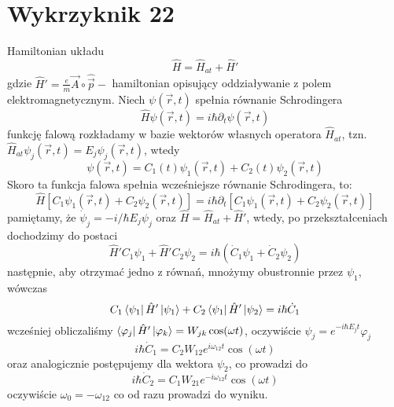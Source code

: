 \documentclass[a4paper,12pt]{article}
\begin{document}
\section{Wykrzyknik 22}
	Hamiltonian układu
		$$
		\hat{H} = \hat{H}_{at} + \hat{H}'
		$$
	gdzie $\hat{H}'=\frac{e}{m}\vec{A}\circ\hat{\vec{p}}-$ hamiltonian opisujący oddziaływanie z polem elektromagnetycznym. Niech $\psi(\vec{r},t)$ spełnia równanie Schrodingera
		$$
		\hat{H}\psi(\vec{r},t)=i\hbar\partial_t \psi(\vec{r},t)
		$$
	funkcję falową rozkładamy w bazie wektorów własnych operatora $\hat{H}_{at}$, tzn. $\hat{H}_{at}\psi_j(\vec{r},t) = E_j\psi_j(\vec{r},t)$, wtedy
		$$
		\psi(\vec{r},t) = C_1(t)\psi_1(\vec{r},t) + C_2(t)\psi_2(\vec{r},t)
		$$
	Skoro ta funkcja falowa spełnia wcześniejsze równanie Schrodingera, to:
		$$
		\hat{H}\left[C_1\psi_1(\vec{r},t) + C_2\psi_2(\vec{r},t)\right] = i\hbar\partial_t\left[C_1\psi_1(\vec{r},t) + C_2\psi_2(\vec{r},t)\right]
		$$
	pamiętamy, że $\dot{\psi}_j = -i/\hbar E_j \psi_j$ oraz $\hat{H} = \hat{H}_{at} + \hat{H}'$, wtedy, po przekształceniach dochodzimy do postaci
		$$
		\hat{H}'C_1\psi_1 + \hat{H}'C_2\psi_2 = i\hbar\left(\dot{C}_1\psi_1+\dot{C}_2\psi_2\right)
		$$
	następnie, aby otrzymać jedno z równań, mnożymy obustronnie przez $\psi_1$, wówczas
		$$
		C_1\bra{\psi_1}\hat{H}'\ket{\psi_1}+C_2\bra{\psi_1}\hat{H}'\ket{\psi_2} = i\hbar\dot{C}_1
		$$
	wcześniej obliczaliśmy $\bra{\varphi_j}\hat{H}'\ket{\varphi_k} = W_{jk}\cos(\omega t)$, oczywiście $\psi_j = e^{-i\hbar E_j t}\varphi_j$
		$$
		i\hbar\dot{C}_1 = C_2 W_{12}e^{i\omega_{12}t}\cos(\omega t)
		$$
	oraz analogicznie postępujemy dla wektora $\psi_2$, co prowadzi do
		$$
		i\hbar\dot{C}_2 = C_1 W_{21}e^{-i\omega_{12}t}\cos(\omega t)
		$$
	oczywiście $\omega_0 = -\omega_{12}$ co od razu prowadzi do wyniku.
\end{document}
